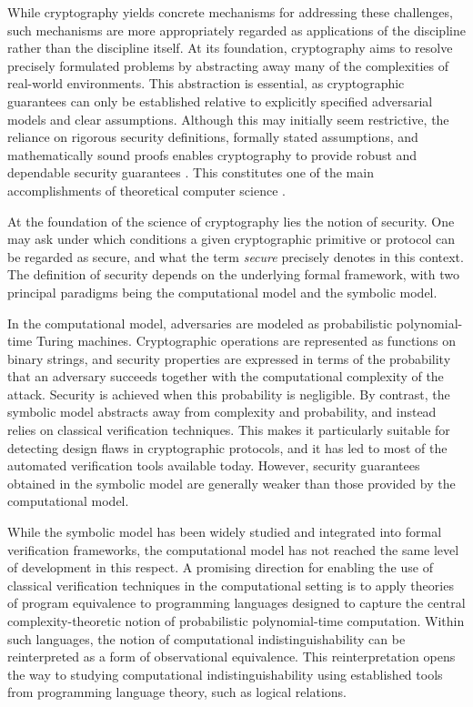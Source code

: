 While cryptography yields concrete mechanisms for addressing these challenges, such mechanisms are more appropriately regarded as applications of the discipline rather than the discipline itself. At its foundation, cryptography aims to resolve precisely formulated problems by abstracting away many of the complexities of real-world environments. This abstraction is essential, as cryptographic guarantees can only be established relative to explicitly specified adversarial models and clear assumptions. Although this may initially seem restrictive, the reliance on rigorous security definitions, formally stated assumptions, and mathematically sound proofs enables cryptography to provide robust and dependable security guarantees \cite{joyofcryptography}. This constitutes one of the main accomplishments of theoretical computer science \cite{theory-of-computing}.

At the foundation of the science of cryptography lies the notion of security. One may ask under which conditions a given cryptographic primitive or protocol can be regarded as secure, and what the term \textit{secure} precisely denotes in this context. The definition of security depends on the underlying formal framework, with two principal paradigms being the computational model and the symbolic model.

In the computational model, adversaries are modeled as probabilistic polynomial-time Turing machines. Cryptographic operations are represented as functions on binary strings, and security properties are expressed in terms of the probability that an adversary succeeds together with the computational complexity of the attack. Security is achieved when this probability is negligible. By contrast, the symbolic model abstracts away from complexity and probability, and instead relies on classical verification techniques. This makes it particularly suitable for detecting design flaws in cryptographic protocols, and it has led to most of the automated verification tools available today. However, security guarantees obtained in the symbolic model are generally weaker than those provided by the computational model.

While the symbolic model has been widely studied and integrated into formal verification frameworks, the computational model has not reached the same level of development in this respect. A promising direction for enabling the use of classical verification techniques in the computational setting is to apply theories of program equivalence to programming languages designed to capture the central complexity-theoretic notion of probabilistic polynomial-time computation. Within such languages, the notion of computational indistinguishability \cite{Goldreich_2001} can be reinterpreted as a form of observational equivalence. This reinterpretation opens the way to studying computational indistinguishability using established tools from programming language theory, such as logical relations.

